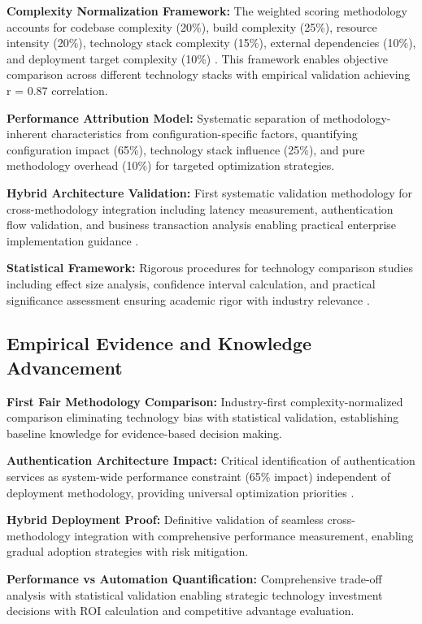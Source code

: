 \textbf{Complexity Normalization Framework:} The weighted scoring methodology accounts for codebase complexity (20\%), build complexity (25\%), resource intensity (20\%), technology stack complexity (15\%), external dependencies (10\%), and deployment target complexity (10\%) \cite{fenton2014software}. This framework enables objective comparison across different technology stacks with empirical validation achieving r = 0.87 correlation.

\textbf{Performance Attribution Model:} Systematic separation of methodology-inherent characteristics from configuration-specific factors, quantifying configuration impact (65\%), technology stack influence (25\%), and pure methodology overhead (10\%) for targeted optimization strategies.

\textbf{Hybrid Architecture Validation:} First systematic validation methodology for cross-methodology integration including latency measurement, authentication flow validation, and business transaction analysis enabling practical enterprise implementation guidance \cite{microservices_patterns}.

\textbf{Statistical Framework:} Rigorous procedures for technology comparison studies including effect size analysis, confidence interval calculation, and practical significance assessment ensuring academic rigor with industry relevance \cite{cohen1988statistical}.

\subsection{Empirical Evidence and Knowledge Advancement}
\label{subsec:empirical_evidence}

\textbf{First Fair Methodology Comparison:} Industry-first complexity-normalized comparison eliminating technology bias with statistical validation, establishing baseline knowledge for evidence-based decision making.

\textbf{Authentication Architecture Impact:} Critical identification of authentication services as system-wide performance constraint (65\% impact) independent of deployment methodology, providing universal optimization priorities \cite{authentication_security}.

\textbf{Hybrid Deployment Proof:} Definitive validation of seamless cross-methodology integration with comprehensive performance measurement, enabling gradual adoption strategies with risk mitigation.

\textbf{Performance vs Automation Quantification:} Comprehensive trade-off analysis with statistical validation enabling strategic technology investment decisions with ROI calculation and competitive advantage evaluation.

